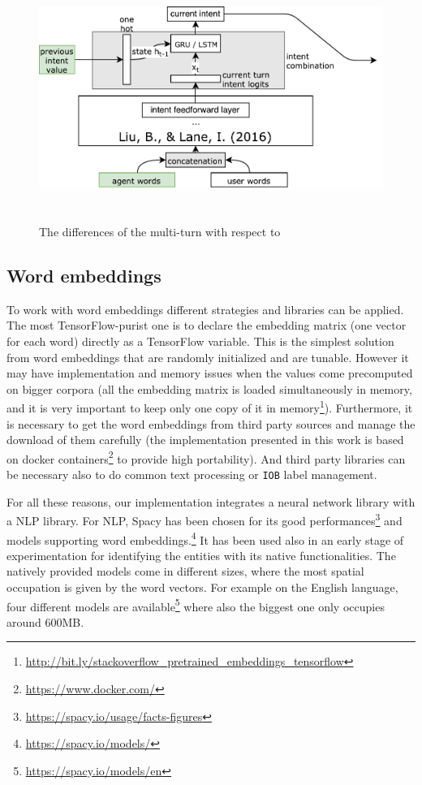 \begin{figure}[!htb]
    \centering
    \includegraphics[max width=0.9\linewidth,max height=8cm,keepaspectratio]{figures/approachMultiTurnDifferences}
    \caption{The differences of the multi-turn with respect to~\cite{liu2016attention}}\label{fig:approachMultiTurnDifferences}
\end{figure}

\subsection{Word embeddings}
\label{implementationWV}

To work with word embeddings different strategies and libraries can be applied. The most TensorFlow-purist one is to declare the embedding matrix (one vector for each word) directly as a TensorFlow variable. This is the simplest solution from word embeddings that are randomly initialized and are tunable. However it may have implementation and memory issues when the values come precomputed on bigger corpora (all the embedding matrix is loaded simultaneously in memory, and it is very important to keep only one copy of it in memory\footnote{\url{http://bit.ly/stackoverflow_pretrained_embeddings_tensorflow}}). Furthermore, it is necessary to get the word embeddings from third party sources and manage the download of them carefully (the implementation presented in this work is based on docker containers\footnote{\url{https://www.docker.com/}} to provide high portability). And third party libraries can be necessary also to do common text processing or \texttt{IOB} label management.

For all these reasons, our implementation integrates a neural network library with a NLP library. For NLP, Spacy has been chosen for its good performances\footnote{\url{https://spacy.io/usage/facts-figures}} and models supporting word embeddings.\footnote{\url{https://spacy.io/models/}} It has been used also in an early stage of experimentation for identifying the entities with its native functionalities. The natively provided models come in different sizes, where the most spatial occupation is given by the word vectors. For example on the English language, four different models are available\footnote{\url{https://spacy.io/models/en}} where also the biggest one only occupies around 600MB.

